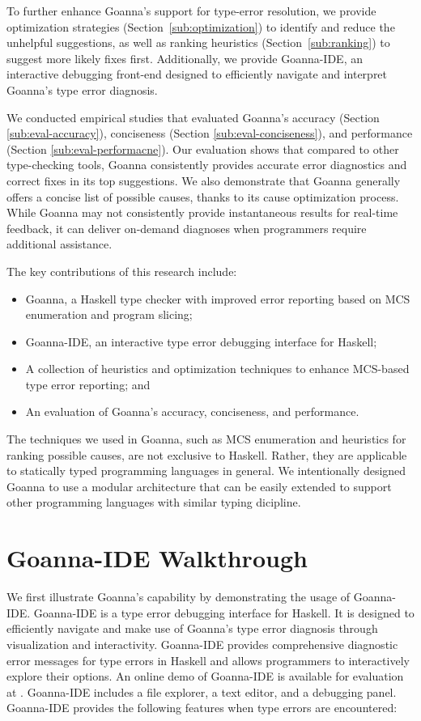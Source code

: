 	To further enhance Goanna's support for type-error resolution, we provide optimization strategies (Section~\ref{sub:optimization}) to identify and reduce the unhelpful suggestions, as well as ranking heuristics (Section~\ref{sub:ranking}) to suggest more likely fixes first. Additionally, we provide Goanna-IDE, an interactive debugging front-end designed to efficiently navigate and interpret Goanna's type error diagnosis.

    We conducted empirical studies that evaluated Goanna's accuracy (Section \ref{sub:eval-accuracy}), conciseness (Section \ref{sub:eval-conciseness}), and performance (Section \ref{sub:eval-performacne}). Our evaluation shows that compared to other type-checking tools, Goanna consistently provides accurate error diagnostics and correct fixes in its top suggestions. We also demonstrate that Goanna generally offers a concise list of possible causes, thanks to its cause optimization process. While Goanna may not consistently provide instantaneous results for real-time feedback, it can deliver on-demand diagnoses when programmers require additional assistance.
    

    The key contributions of this research include:
    \begin{itemize}
        \item Goanna, a Haskell type checker with improved error reporting based on MCS enumeration and program slicing;
        \item Goanna-IDE, an interactive type error debugging interface for Haskell; 
        \item A collection of heuristics and optimization techniques to enhance MCS-based type error reporting; and
        \item An evaluation of Goanna's accuracy, conciseness, and performance.
    \end{itemize}

  The techniques we used in Goanna, such as MCS enumeration and heuristics for ranking possible causes, are not exclusive to Haskell. Rather, they are applicable to statically typed programming languages in general. We intentionally designed Goanna to use a modular architecture that can be easily extended to support other programming languages with similar typing dicipline.


    \section{Goanna-IDE Walkthrough} \label{walkthrough}
    We first illustrate Goanna's capability by demonstrating the usage of Goanna-IDE. Goanna-IDE is a type error debugging interface for Haskell. It is designed to efficiently navigate and make use of Goanna's type error diagnosis through visualization and interactivity. Goanna-IDE provides comprehensive diagnostic error messages for type errors in Haskell and allows programmers to interactively explore their options. An online demo of Goanna-IDE is available for evaluation at \cite{Anonymous2023-bo}. Goanna-IDE includes a file explorer, a text editor, and a debugging panel. Goanna-IDE provides the following features when type errors are encountered:

